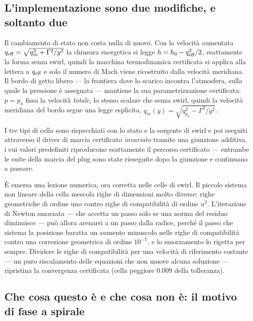 \subsection{L'implementazione sono due modifiche, e soltanto due}

Il cambiamento di stato non costa nulla di nuovo. Con la velocità
aumentata $q_{\rm eff} = \sqrt{q_m^2 + \Gamma^2/y^2}$ la chiusura
energetica si legge $h = h_0 - q_{\rm eff}^2/2$, esattamente la forma
senza swirl, quindi la macchina termodinamica certificata si applica
alla lettera a $q_{\rm eff}$ e solo il numero di Mach viene
ricostruito dalla velocità meridiana. Il bordo di getto libero --- la
frontiera dove lo scarico incontra l'atmosfera, sulla quale la
pressione è assegnata --- mantiene la sua parametrizzazione
certificata: $p = p_a$ fissa la velocità \emph{totale}, lo stesso
scalare che senza swirl, quindi la velocità meridiana del bordo segue
una legge esplicita, $q_m(y) = \sqrt{q_{p_a}^2 - \Gamma^2/y^2}$.

I tre tipi di cella sono rispecchiati con lo stato e la sorgente di
swirl e poi eseguiti attraverso il driver di marcia certificato
\emph{invariato} tramite una giunzione additiva, i cui valori
predefiniti riproducono esattamente il percorso certificato ---
entrambe le suite della marcia del plug sono state rieseguite dopo la
giunzione e continuano a passare.

È emersa una lezione numerica, ora corretta nelle celle di swirl. Il
piccolo sistema non lineare della cella mescola righe di dimensioni
molto diverse: righe geometriche di ordine uno contro righe di
compatibilità di ordine $u^2$. L'iterazione di Newton smorzata ---
che accetta un passo solo se una norma del residuo diminuisce ---
può allora arenarsi a un passo dalla radice, perché il passo che
sistema la posizione baratta un aumento minuscolo nelle righe di
compatibilità contro una correzione geometrica di ordine $10^{-7}$, e
lo smorzamento lo rigetta per sempre. Dividere le righe di
compatibilità per una velocità di riferimento costante --- un puro
riscalamento delle equazioni che non muove alcuna soluzione ---
ripristina la convergenza certificata (cella peggiore $0.009$ della
tolleranza).

\subsection{Che cosa questo è e che cosa non è: il motivo di fase a
spirale}
\label{sec:spiral}

